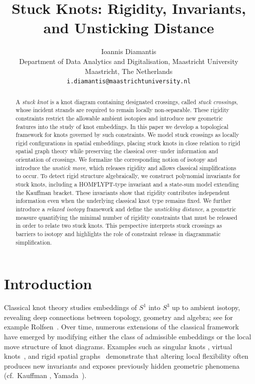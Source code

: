 \documentclass[11pt,a4paper]{article}
\title{Stuck Knots: Rigidity, Invariants, and Unsticking Distance}
\author{Ioannis Diamantis\\
\small Department of Data Analytics and Digitalisation, Maastricht University\\
\small Maastricht, The Netherlands\\
\small \texttt{i.diamantis@maastrichtuniversity.nl}}
\date{}
\theoremstyle{plain}
\theoremstyle{definition}
\begin{document}
\maketitle

\begin{abstract}
A {\it stuck knot} is a knot diagram containing designated crossings, called {\it stuck crossings}, whose incident strands are required to remain locally non-separable. These rigidity constraints restrict the allowable ambient isotopies and introduce new geometric features into the study of knot embeddings. In this paper we develop a topological framework for knots governed by such constraints. We model stuck crossings as locally rigid configurations in spatial embeddings, placing stuck knots in close relation to rigid spatial graph theory while preserving the classical over–under information and orientation of crossings. We formalize the corresponding notion of isotopy and introduce the {\it unstick move}, which releases rigidity and allows classical simplifications to occur. To detect rigid structure algebraically, we construct polynomial invariants for stuck knots, including a HOMFLYPT-type invariant and a state-sum model extending the Kauffman bracket. These invariants show that rigidity contributes independent information even when the underlying classical knot type remains fixed. We further introduce a {\it relaxed isotopy} framework and define the {\it unsticking distance}, a geometric measure quantifying the minimal number of rigidity constraints that must be released in order to relate two stuck knots. This perspective interprets stuck crossings as barriers to isotopy and highlights the role of constraint release in diagrammatic simplification. 
\end{abstract}

\begingroup
\renewcommand{\thefootnote}{}
\endgroup


\section{Introduction}

Classical knot theory studies embeddings of $S^1$ into $S^3$ up to ambient isotopy, revealing deep connections between topology, geometry and algebra; see for example Rolfsen~\cite{Rolfsen}. Over time, numerous extensions of the classical framework have emerged by modifying either the class of admissible embeddings or the local move structure of knot diagrams. Examples such as singular knots \cite{Vassiliev1990}, virtual knots~\cite{Kauffman1999}, and rigid spatial graphs~\cite{Kauffman1989} demonstrate that altering local flexibility often produces new invariants and exposes previously hidden geometric phenomena (cf.~Kauffman \cite{Kauffman1991}, Yamada~\cite{Yamada1989}).
\end{document}
